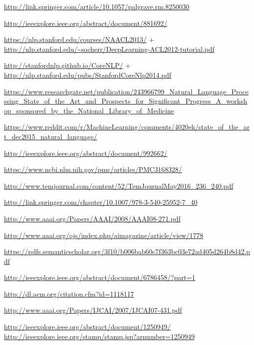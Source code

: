 \documentclass[9pt]{article}
\begin{document}
\begin{thebibliography}{99}

 \url{http://link.springer.com/article/10.1057/palgrave.rm.8250030}

 \url{http://ieeexplore.ieee.org/abstract/document/881692/}

 \url{https://nlp.stanford.edu/courses/NAACL2013/} $+$ \url{http://nlp.stanford.edu/~socherr/DeepLearning-ACL2012-tutorial.pdf}

 \url{http://stanfordnlp.github.io/CoreNLP/} $+$ \url{http://nlp.stanford.edu/pubs/StanfordCoreNlp2014.pdf}

 \url{https://www.researchgate.net/publication/243966799_Natural_Language_Processing_State_of_the_Art_and_Prospects_for_Significant_Progress_A_workshop_sponsored_by_the_National_Library_of_Medicine}

 \url{https://www.reddit.com/r/MachineLearning/comments/4020ek/state_of_the_art_dec2015_natural_language/}

 \url{http://ieeexplore.ieee.org/abstract/document/992662/}

 \url{https://www.ncbi.nlm.nih.gov/pmc/articles/PMC3168328/}

 \url{http://www.temjournal.com/content/52/TemJournalMay2016_236_240.pdf}

 \url{http://link.springer.com/chapter/10.1007/978-3-540-25952-7_40}

 \url{http://www.aaai.org/Papers/AAAI/2008/AAAI08-271.pdf}

 \url{http://www.aaai.org/ojs/index.php/aimagazine/article/view/1778}

 \url{https://pdfs.semanticscholar.org/3f10/b006bab60c7f363bc03e72ad405d264b8d42.pdf}

 \url{http://ieeexplore.ieee.org/abstract/document/6786458/?part=1}

 \url{http://dl.acm.org/citation.cfm?id=1118117}

 \url{http://www.aaai.org/Papers/IJCAI/2007/IJCAI07-431.pdf}

 \url{http://ieeexplore.ieee.org/abstract/document/1250949/} \url{http://ieeexplore.ieee.org/stamp/stamp.jsp?arnumber=1250949}


\end{thebibliography}
\end{document}

